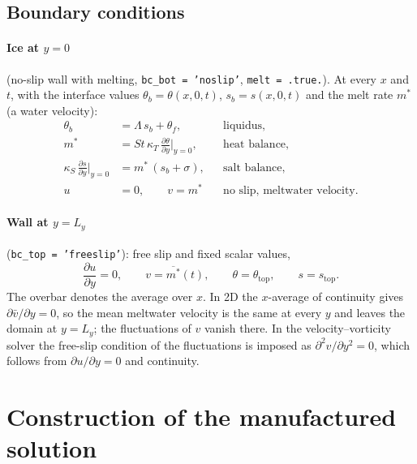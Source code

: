 \documentclass[11pt,a4paper]{article}
\newcommand{\pd}[2]{\frac{\partial #1}{\partial #2}}
\begin{document}
\subsection{Boundary conditions}

\paragraph{\texorpdfstring{Ice at $y=0$}{Ice at y=0}} (no-slip wall with melting, \texttt{bc\_bot = 'noslip'}, \texttt{melt = .true.}).
At every $x$ and $t$, with the interface values $\theta_b=\theta(x,0,t)$, $s_b=s(x,0,t)$ and the melt rate
$m^*$ (a water velocity):
\begin{align}
  \theta_b &= \Lambda\, s_b + \theta_f,                       && \text{liquidus,} \label{eq:liq}\\
  m^* &= St\,\kappa_T\, \pd{\theta}{y}\Big|_{y=0},              && \text{heat balance,} \label{eq:heat}\\
  \kappa_S\,\pd{s}{y}\Big|_{y=0} &= m^*\,(s_b+\sigma),          && \text{salt balance,} \label{eq:salt}\\
  u &= 0, \qquad v = m^*                                       && \text{no slip, meltwater velocity.} \label{eq:vel0}
\end{align}

\paragraph{\texorpdfstring{Wall at $y=L_y$}{Wall at y=Ly}} (\texttt{bc\_top = 'freeslip'}): free slip and fixed scalar values,
\begin{equation}
  \pd{u}{y} = 0, \qquad v = \overline{m^*}(t), \qquad \theta=\theta_{\mathrm{top}}, \qquad s=s_{\mathrm{top}}.
  \label{eq:top}
\end{equation}
The overbar denotes the average over $x$. In 2D the $x$-average of continuity gives
$\partial\bar v/\partial y = 0$, so the mean meltwater velocity is the same at every $y$ and leaves the domain
at $y=L_y$; the fluctuations of $v$ vanish there. In the velocity--vorticity solver the free-slip condition
of the fluctuations is imposed as $\partial^2 v/\partial y^2=0$, which follows from
$\partial u/\partial y=0$ and continuity.

\section{Construction of the manufactured solution}
\end{document}
